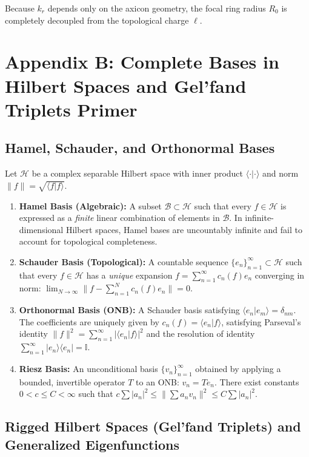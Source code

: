 \documentclass[11pt,a4paper]{article}
\begin{document}
Because $k_r$ depends only on the axicon geometry, the focal ring radius $R_0$ is completely decoupled from the topological charge $\ell$.

\section{Appendix B: Complete Bases in Hilbert Spaces and Gel'fand Triplets Primer}
\label{app:hilbert}

\subsection{Hamel, Schauder, and Orthonormal Bases}

Let $\mathcal{H}$ be a complex separable Hilbert space with inner product $\langle \cdot | \cdot \rangle$ and norm $\|f\| = \sqrt{\langle f | f \rangle}$.
\begin{enumerate}
    \item \textbf{Hamel Basis (Algebraic):} A subset $\mathcal{B} \subset \mathcal{H}$ such that every $f \in \mathcal{H}$ is expressed as a \emph{finite} linear combination of elements in $\mathcal{B}$. In infinite-dimensional Hilbert spaces, Hamel bases are uncountably infinite and fail to account for topological completeness.
    \item \textbf{Schauder Basis (Topological):} A countable sequence $\{e_n\}_{n=1}^\infty \subset \mathcal{H}$ such that every $f \in \mathcal{H}$ has a \emph{unique} expansion $f = \sum_{n=1}^\infty c_n(f) e_n$ converging in norm: $\lim_{N \to \infty} \|f - \sum_{n=1}^N c_n(f) e_n\| = 0$.
    \item \textbf{Orthonormal Basis (ONB):} A Schauder basis satisfying $\langle e_n | e_m \rangle = \delta_{nm}$. The coefficients are uniquely given by $c_n(f) = \langle e_n | f \rangle$, satisfying Parseval's identity $\|f\|^2 = \sum_{n=1}^\infty |\langle e_n | f \rangle|^2$ and the resolution of identity $\sum_{n=1}^\infty |e_n\rangle \langle e_n| = \mathbb{I}$.
    \item \textbf{Riesz Basis:} An unconditional basis $\{v_n\}_{n=1}^\infty$ obtained by applying a bounded, invertible operator $T$ to an ONB: $v_n = T e_n$. There exist constants $0 < c \le C < \infty$ such that $c \sum |a_n|^2 \le \|\sum a_n v_n\|^2 \le C \sum |a_n|^2$.
\end{enumerate}

\subsection{Rigged Hilbert Spaces (Gel'fand Triplets) and Generalized Eigenfunctions}
\end{document}
